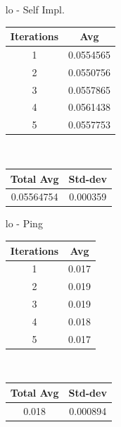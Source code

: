\begin{enumerate}
    \item [lo - Self Impl.]
        \begin{center}
            \begin{tabular}{||c c||} 
             \hline
             Iterations & Avg \\ [0.5ex] 
             \hline\hline
             1 & 0.0554565  \\ 
             \hline
             2 & 0.0550756 \\ 
             \hline
             3 & 0.0557865 \\ 
             \hline
             4 & 0.0561438 \\ 
             \hline
             5 & 0.0557753  \\ 
             \hline
             \hline
            \end{tabular} \\
            \begin{tabular}{||c c||} 
             \hline
             Total Avg & Std-dev \\ [0.5ex] 
             \hline\hline
             0.05564754 & 0.000359 \\ 
             \hline
             \hline
            \end{tabular}
        \end{center}
     \item [lo - Ping]
        \begin{center}
            \begin{tabular}{||c c||} 
             \hline
             Iterations & Avg \\ [0.5ex] 
             \hline\hline
             1 & 0.017  \\ 
             \hline
             2 & 0.019  \\ 
             \hline
             3 & 0.019  \\ 
             \hline
             4 & 0.018 \\ 
             \hline
             5 & 0.017  \\ 
             \hline
             \hline
            \end{tabular} \\
            \begin{tabular}{||c c||} 
             \hline
             Total Avg & Std-dev \\ [0.5ex] 
             \hline\hline
             0.018 & 0.000894 \\ 

\end{tabular}
\end{center}
\end{enumerate}
